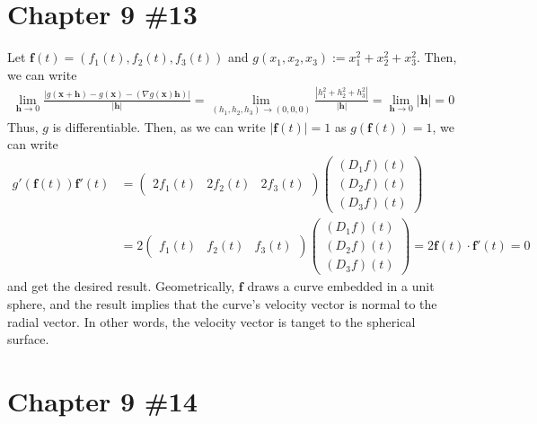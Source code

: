 \documentclass{scrartcl}
\begin{document}
\section{Chapter 9 \#13}
Let \(\mathbf{f}(t) = (f_1(t), f_2(t), f_3(t))\) and \(g(x_1, x_2, x_3) :=
x^2_1 + x^2_2 + x^2_3\). Then, we can write
\begin{align*}
  \lim_{\mathbf{h} \to 0} \frac{|g(\mathbf{x} + \mathbf{h})
    - g(\mathbf{x}) - (\nabla g(\mathbf{x})\mathbf{h})|}{|\mathbf{h}|}
  = \lim_{(h_1, h_2, h_3) \to (0, 0, 0)}
    \frac{|h^2_1 + h^2_2 + h^2_3|}{|\mathbf{h}|}
  = \lim_{\mathbf{h} \to 0} |\mathbf{h}|
  = 0
\end{align*}
Thus, \(g\) is differentiable. Then, as we can write \(|\mathbf{f}(t)| = 1\) as
\(g(\mathbf{f}(t)) = 1\), we can write
\begin{align*}
  g'(\mathbf{f}(t)) \mathbf{f}'(t)
  &= \begin{pmatrix}
    2f_1(t) & 2f_2(t) & 2f_3(t)
  \end{pmatrix} \begin{pmatrix}
    (D_1 f) (t) \\
    (D_2 f) (t) \\
    (D_3 f) (t)
  \end{pmatrix} \\
  &= 2 \begin{pmatrix}
    f_1(t) & f_2(t) & f_3(t)
  \end{pmatrix} \begin{pmatrix}
    (D_1 f) (t) \\
    (D_2 f) (t) \\
    (D_3 f) (t)
  \end{pmatrix}
  = 2 \mathbf{f}(t) \cdot \mathbf{f}'(t)
  = 0
\end{align*}
and get the desired result. Geometrically, \(\mathbf{f}\) draws a curve
embedded in a unit sphere, and the result implies that the curve's velocity
vector is normal to the radial vector. In other words, the velocity vector is
tanget to the spherical surface.

\section{Chapter 9 \#14}
\end{document}
